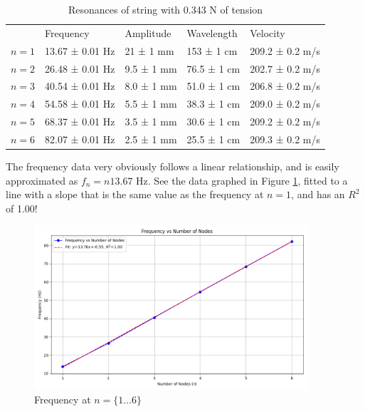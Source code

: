 \documentclass[12pt,letterpaper]{article}
\begin{document}
\begin{table}[ht]
\centering
\begin{tabular}{lllll}
                           & Frequency                            & Amplitude                       & Wavelength                       & Velocity                              \\ \cline{2-5} 
\multicolumn{1}{l|}{$n=1$} & \multicolumn{1}{l|}{13.67 ± 0.01 Hz} & \multicolumn{1}{l|}{21 ± 1 mm}  & \multicolumn{1}{l|}{153 ± 1 cm}  & \multicolumn{1}{l|}{209.2 ± 0.2 m/s} \\ \cline{2-5} 
\multicolumn{1}{l|}{$n=2$} & \multicolumn{1}{l|}{26.48 ± 0.01 Hz} & \multicolumn{1}{l|}{9.5 ± 1 mm} & \multicolumn{1}{l|}{76.5 ± 1 cm} & \multicolumn{1}{l|}{202.7 ± 0.2 m/s} \\ \cline{2-5} 
\multicolumn{1}{l|}{$n=3$} & \multicolumn{1}{l|}{40.54 ± 0.01 Hz} & \multicolumn{1}{l|}{8.0 ± 1 mm} & \multicolumn{1}{l|}{51.0 ± 1 cm} & \multicolumn{1}{l|}{206.8 ± 0.2 m/s} \\ \cline{2-5} 
\multicolumn{1}{l|}{$n=4$} & \multicolumn{1}{l|}{54.58 ± 0.01 Hz} & \multicolumn{1}{l|}{5.5 ± 1 mm} & \multicolumn{1}{l|}{38.3 ± 1 cm} & \multicolumn{1}{l|}{209.0 ± 0.2 m/s} \\ \cline{2-5} 
\multicolumn{1}{l|}{$n=5$} & \multicolumn{1}{l|}{68.37 ± 0.01 Hz} & \multicolumn{1}{l|}{3.5 ± 1 mm} & \multicolumn{1}{l|}{30.6 ± 1 cm} & \multicolumn{1}{l|}{209.2 ± 0.2 m/s} \\ \cline{2-5} 
\multicolumn{1}{l|}{$n=6$} & \multicolumn{1}{l|}{82.07 ± 0.01 Hz} & \multicolumn{1}{l|}{2.5 ± 1 mm} & \multicolumn{1}{l|}{25.5 ± 1 cm} & \multicolumn{1}{l|}{209.3 ± 0.2 m/s} \\ \cline{2-5} 
\end{tabular}
\label{tab:35g}
\caption{Resonances of string with 0.343 N of tension}
\end{table}

The frequency data very obviously follows a linear relationship, and is easily approximated as $f_n=n13.67$ Hz. See the data graphed in Figure \ref{fig:frequency}, fitted to a line with a slope that is the same value as the frequency at $n=1$, and has an $R^2$ of 1.00! 

\begin{figure}[h]
    \centering
    \includegraphics[width=4in]{images/frequency1-6.png}
    \caption{Frequency at $n=\{1\dots6\}$}
    \label{fig:frequency}
\end{figure}
\end{document}
